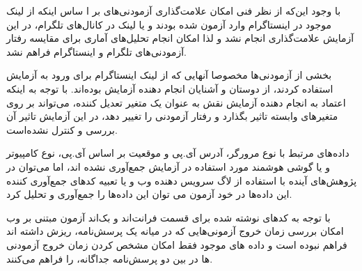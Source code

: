 با وجود این‌که از نظر فنی امکان علامت‌گذاری آزمودنی‌های بر ا ساس اینکه از لینک موجود در اینستاگرام وارد آزمون شده بودند و یا لینک
در کانال‌های تلگرام، در این آزمایش علامت‌گذاری انجام نشد و لذا امکان انجام تحلیل‌های آماری برای مقایسه رفتار آزمودنی‌های تلگرام و اینستاگرام
فراهم نشد.

بخشی از آزمودنی‌ها مخصوصا آنهایی که از لینک اینستاگرام برای ورود به آزمایش استفاده
کردند، از دوستان و آشنایان انجام دهنده آزمایش بوده‌اند. با توجه به اینکه اعتماد به انجام دهنده آزمایش نقش
به عنوان یک متغیر تعدیل کننده، می‌تواند بر روی متغیر‌های وابسته تاثیر بگذارد و رفتار آزمودنی را تغییر دهد،
در این آزمایش تاثیر آن بررسی و کنترل نشده‌است.

داده‌های مرتبط با نوع مرورگر، آدرس آی.پی و موقعیت بر اساس آی.پی، نوع کامپیوتر و یا گوشی هوشمند مورد استفاده
در آزمایش جمع‌آوری نشده اند، اما می‌توان در پژوهش‌های آینده با استفاده از لاگ سرویس دهنده وب و یا تعبیه کدهای جمع‌آوری کننده این داده‌ها
در خود آزمون می توان این داده‌ها را جمع‌آوری و تحلیل کرد.

با توجه به کدهای نوشته شده برای قسمت فرانت‌اند و بک‌اند آزمون مبتنی بر وب امکان بررسی زمان خروج آزمونی‌هایی که در میانه یک پرسش‌نامه،
ریزش داشته اند فراهم نبوده است و داده های موجود فقط امکان مشخص کردن زمان خروج آزمودنی ها در بین دو پرسش‌نامه جداگانه، را فراهم  می‌کنند.


